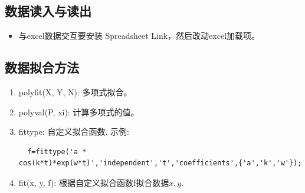 \documentclass[12pt,a4paper]{article}
\begin{document}
\subsection{数据读入与读出}
\begin{itemize}
  \item 与excel数据交互要安装 Spreadsheet Link，然后改动excel加载项。
\end{itemize}
\subsection{数据拟合方法}
\begin{enumerate}
  \item polyfit(X, Y, N): 多项式拟合。
  \item polyval(P, xi): 计算多项式的值。
  \item fittype: 自定义拟合函数. 示例:
  \begin{lstlisting}
  f=fittype('a * cos(k*t)*exp(w*t)','independent','t','coefficients',{'a','k','w'});
  \end{lstlisting}
  \item fit(x, y, f): 根据自定义拟合函数f拟合数据$x,y$.
\end{enumerate}
\end{document}
